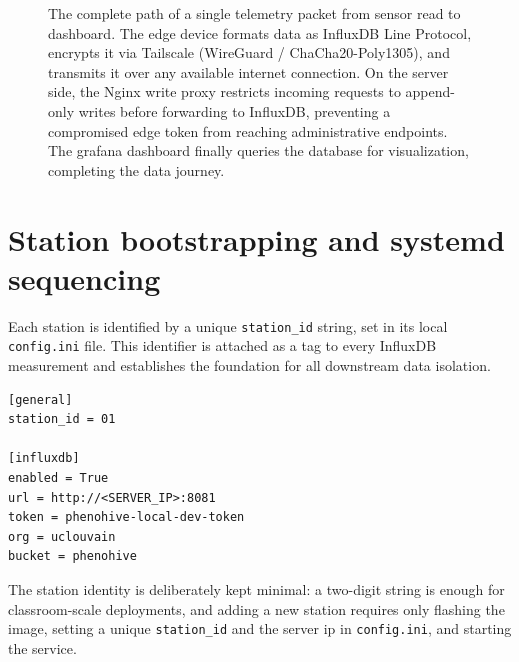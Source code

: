 \begin{figure}[H]
{
}
\caption[Secure Data Path from Sensor to Grafana]{The complete path of a single telemetry packet from sensor read to dashboard. The edge device formats data as InfluxDB Line Protocol, encrypts it via Tailscale (WireGuard / ChaCha20-Poly1305), and transmits it over any available internet connection. On the server side, the Nginx write proxy restricts incoming requests to append-only writes before forwarding to InfluxDB, preventing a compromised edge token from reaching administrative endpoints. The grafana dashboard finally queries the database for visualization, completing the data journey.}
\label{fig:sensor-to-grafana-path}
\end{figure}

\section{Station bootstrapping and systemd sequencing}

Each station is identified by a unique \texttt{station\_id} string, set in its local \texttt{config.ini} file. This identifier is attached as a tag to every InfluxDB measurement and establishes the foundation for all downstream data isolation.

\begin{verbatim}
[general]
station_id = 01

[influxdb]
enabled = True
url = http://<SERVER_IP>:8081
token = phenohive-local-dev-token
org = uclouvain
bucket = phenohive
\end{verbatim}

The station identity is deliberately kept minimal: a two-digit string is enough for classroom-scale deployments, and adding a new station requires only flashing the image, setting a unique \texttt{station\_id} and the server ip in \texttt{config.ini}, and starting the service.

